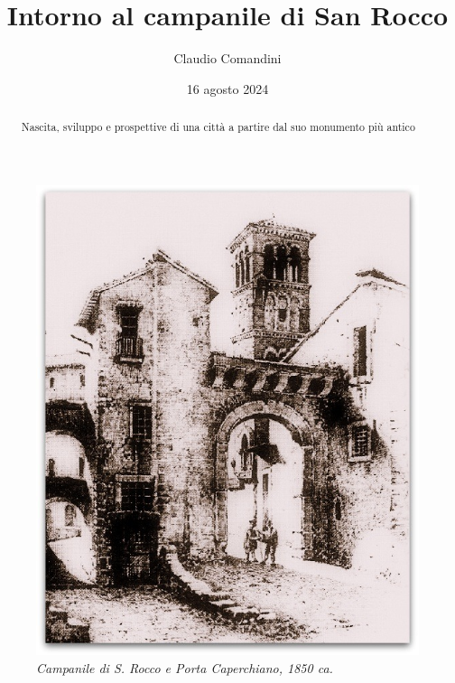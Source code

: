 \documentclass[
  letterpaper,
  DIV=11,
  numbers=noendperiod]{scrartcl}
\title{Intorno al campanile di San Rocco}
\author{Claudio Comandini}
\date{16 agosto 2024}
\begin{document}
\maketitle
\begin{abstract}
Nascita, sviluppo e prospettive di una città a partire dal suo monumento
più antico
\end{abstract}
\ifdefined\Shaded\renewenvironment{Shaded}{\begin{tcolorbox}[interior hidden, boxrule=0pt, breakable, frame hidden, borderline west={3pt}{0pt}{shadecolor}, enhanced, sharp corners]}{\end{tcolorbox}}\fi

\begin{figure}

{\centering \includegraphics{../../images/2024/san_rocco/1CampanileSRoccoPortaCapestrano.jpg}

}

\caption{\emph{Campanile di S. Rocco e Porta Caperchiano, 1850 ca.}}

\end{figure}
\end{document}
